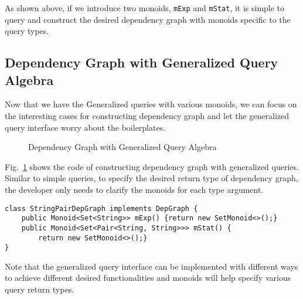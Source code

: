 
As shown above, if we introduce two monoids, \lstinline{mExp} and \lstinline{mStat}, it is simple to query and construct the desired dependency graph with monoids specific to the query types.  

\subsection{Dependency Graph with Generalized Query Algebra}\label{subsec:DepGraphWithGeneralizedQuery}
Now that we have the Generalized queries with various monoids, we can focus on the interesting cases for constructing dependency graph and let the generalized query interface worry about the boilerplates. 

\begin{figure}[tb]
\vspace{-.1in}
\caption{Dependency Graph with Generalized Query Algebra}
\label{deps2}
\end{figure}

Fig.~\ref{deps2} shows the code of constructing dependency graph with generalized queries. Similar to simple queries, to specify the desired return type of dependency graph, the developer only needs to clarify the monoids for each type argument. 

\begin{lstlisting}[numbers=none]
class StringPairDepGraph implements DepGraph {
	public Monoid<Set<String>> mExp() {return new SetMonoid<>();}
	public Monoid<Set<Pair<String, String>>> mStat() {
		return new SetMonoid<>();}
}
\end{lstlisting}

Note that the generalized query interface can be implemented with different ways to achieve different desired functionalities and monoids will help specify various query return types. 
